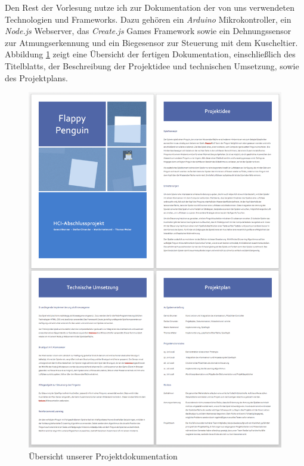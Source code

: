 \documentclass{report}
\begin{document}
Den Rest der Vorlesung nutze ich zur Dokumentation der von uns verwendeten Technologien und Frameworks. Dazu gehören ein \textit{Arduino} Mikrokontroller, ein \textit{Node.js} Webserver, das \textit{Create.js} Games Framework sowie ein Dehnungssensor zur Atmungserkennung und ein Biegesensor zur Steuerung mit dem Kuscheltier. \\

\noindent Abbildung \ref{fig:documentation} zeigt eine Übersicht der fertigen Dokumentation, einschließlich des Titelblatts, der Beschreibung der Projektidee und technischen Umsetzung, sowie des Projektplans.

\begin{figure}
	\center
	\includegraphics[width=130mm]{img/documentation}
	\caption{Übersicht unserer Projektdokumentation}
	\label{fig:documentation}
\end{figure}
\pagebreak
\end{document}
